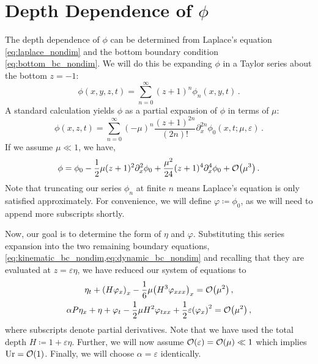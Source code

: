 \documentclass{jfm}
\DeclareMathOperator{\Ur}{Ur}
\renewcommand*{\epsilon}{\varepsilon}
\begin{document}
\section{Depth Dependence of \texorpdfstring{$\phi$}{Velocity Potential}}
The depth dependence of $\phi$ can be determined from Laplace's equation
\cref{eq:laplace_nondim} and the bottom boundary condition
\cref{eq:bottom_bc_nondim}.
We will do this be expanding $\phi$ in a Taylor series about the bottom
$z=-1$:
\begin{equation}
  \phi(x,y,z,t) = \sum_{n=0}^\infty (z+1)^n\phi_n(x,y,t) \,.
\end{equation}
A standard calculation \citep[\eg][]{mei2005nonlinear} yields $\phi$
as a partial expansion of $\phi$ in terms of $\mu$:
\begin{equation}
  \phi(x,z,t) = \sum_{n=0}^{\infty} (-\mu)^n \frac{(z+1)^{2n}}{(2n)!}
  \partial_x^{2n} \phi_0(x,t; \mu, \epsilon) \,.
  \label{eq:phi_expansion}
\end{equation}
If we assume $\mu \ll 1$, we have,
\begin{equation}
  \phi = \phi_0 - \frac{1}{2}\mu (z+1)^2\partial^2_x\phi_0 +
  \frac{\mu^2}{24}(z+1)^4\partial^4_x\phi_0 +
  \order{\mu^3} \,.
\end{equation}
Note that truncating our series $\phi_n$ at finite $n$ means
Laplace's equation is only satisfied approximately.
For convenience, we will define $\varphi \coloneqq \phi_0$, as we will
need to append more subscripts shortly.

Now, our goal is to determine the form of $\eta$ and $\varphi$.
Substituting this series expansion into the two
remaining boundary equations,
\cref{eq:kinematic_bc_nondim,eq:dynamic_bc_nondim} and recalling that
they are evaluated at $z=\epsilon \eta$, we have reduced our system of
equations to
\begin{gather}
  \eta_t + \pqty{H\varphi_x}_x
    -\frac{1}{6}\mu \pqty{H^3\varphi_{xxx}}_x =
    \order{\mu^2} \label{eq:kinematic_bc_varphi} \,, \\
  \alpha P \eta_x + \eta + \varphi_t - \frac{1}{2}\mu H^2\varphi_{txx} +
    \frac{1}{2}\epsilon\pqty{\varphi_x}^2 = \order{\mu^2} \,,
  \label{eq:dynamic_bc_varphi}
\end{gather}
where subscripts denote partial derivatives.
Note that we have used the total depth $H\coloneqq 1+\epsilon\eta$.
Further, we will now assume $\order{\epsilon} = \order{\mu} \ll 1$ which
implies $\Ur = \order{1}$.
Finally, we will choose $\alpha = \epsilon$ identically.
\end{document}

